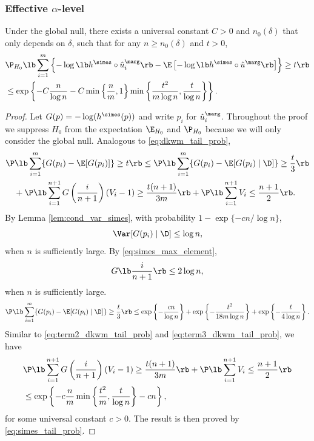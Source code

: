 \subsubsection{Effective $\alpha$-level}
\begin{lemma}\label{lem:fisher_simes_tail}
  Under the global null, there exists a universal constant $C > 0$ and $n_0(\delta)$ that only depends on $\delta$, such that for any $n\ge n_0(\delta)$ and $t > 0$,
  \begin{align*}
    &\P_{H_0}\lb \sum_{i=1}^{m}\left\{-\log\lb h^{\simes} \circ \hat{u}^\marg_i\rb - \E\left[-\log\lb h^{\simes} \circ \hat{u}^\marg\rb\right]\right\}\ge t\rb\\
    & \le \exp\left\{-C\frac{n}{\log n} - C\min\left\{\frac{n}{m}, 1\right\}\min\left\{\frac{t^2}{m\log n}, \frac{t}{\log n}\right\}\right\}.
  \end{align*}
\end{lemma}
\begin{proof}
  Let $G(p) = -\log (h^\simes(p))$ and write $p_i$ for $\hat{u}^\marg_i$. Throughout the proof we suppress $H_0$ from the expectation $\E_{H_0}$ and $\P_{H_0}$ because we will only consider the global null. Analogous to \eqref{eq:dkwm_tail_prob},
  \begin{align}
    &\P\lb \sum_{i=1}^{m}\{G(p_i) - \E[G(p_i)]\}\ge t\rb\le     \P\lb \sum_{i=1}^{m}\{G(p_i) - \E[G(p_i)\mid \D]\}\ge \frac{t}{3}\rb\nonumber\\
    & \quad + \P\lb \sum_{i=1}^{n+1}G\left(\frac{i}{n+1}\right)(V_{i} - 1)\ge \frac{t(n+1)}{3m}\rb + \P\lb \sum_{i=1}^{n+1}V_{i} \le \frac{n+1}{2}\rb\label{eq:simes_tail_prob}.
  \end{align}
  By Lemma \ref{lem:cond_var_simes}, with probability $1 - \exp\{-cn/\log n\}$,
  \[\Var[G(p_i)\mid \D] \le \log n,\]
  when $n$ is sufficiently large. By \eqref{eq:simes_max_element},
  \[G\lb\frac{i}{n+1}\rb\le 2\log n,\]
  when $n$ is sufficiently large.
  \begin{align*}
    \P\lb \sum_{i=1}^{m}\{G(p_i) - \E[G(p_i)\mid \D]\}\ge \frac{t}{3}\rb\le \exp\left\{-\frac{cn}{\log n}\right\} + \exp \left\{-\frac{t^2}{18m\log n}\right\} + \exp\left\{-\frac{t}{4\log n}\right\}.
  \end{align*}
  Similar to \eqref{eq:term2_dkwm_tail_prob} and \eqref{eq:term3_dkwm_tail_prob}, we have
  \begin{align*}
    &\P\lb \sum_{i=1}^{n+1}G\left(\frac{i}{n+1}\right)(V_{i} - 1)\ge \frac{t(n+1)}{3m}\rb + \P\lb \sum_{i=1}^{n+1}V_{i} \le \frac{n+1}{2}\rb\\
    & \le \exp\left\{-c\frac{n}{m}\min\left\{\frac{t^2}{m}, \frac{t}{\log n}\right\} - cn\right\},
  \end{align*}
  for some universal constant $c > 0$. The result is then proved by \eqref{eq:simes_tail_prob}.
\end{proof}

